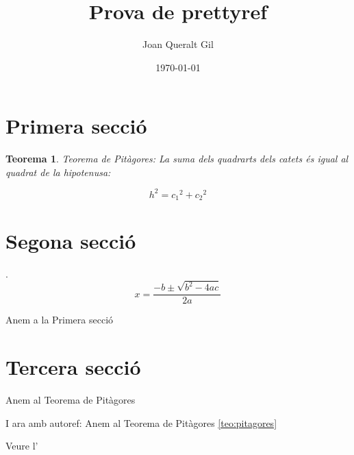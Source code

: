 \documentclass[fontsize=11pt,%
               paper=a4,%
               captions=tableheading,%
               numbers=noenddot,%
               parskip=full,%
               ]{scrartcl}
\author{Joan Queralt Gil}
\title{Prova de prettyref}
\date{\today}
\newtheorem{meuteo}{Teorema}
\begin{document}
\maketitle

\tableofcontents

\section{Primera secció}\label{sec:primera}
\lipsum[1-3]

\begin{meuteo}\label{teo:pitagores}
 Teorema de Pitàgores: La suma dels quadrarts dels catets és igual al quadrat de la hipotenusa:
 
 \[h^2 = c_1{^2} + c_2{^2} \]
\end{meuteo}


\lipsum[2-3]

\section{Segona secció}\label{sec:segona}
\lipsum[1-3].
\begin{equation}\label{eq:segongrau}
 x=\frac{-b\pm\sqrt{b^2-4ac}}{2a}
\end{equation}


Anem a la Primera secció 

\lipsum[2-3]

\section{Tercera secció}\label{sec:tercera}
\lipsum[1-3]

Anem al Teorema de Pitàgores 

I ara amb autoref: Anem al Teorema de Pitàgores \autoref{teo:pitagores}

\lipsum[2-3]

Veure l'

\lipsum[2-3]
\end{document}

